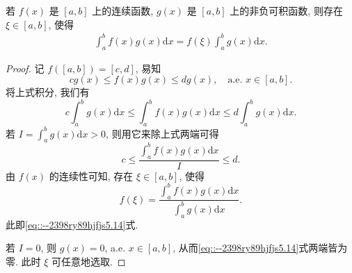 \documentclass[../../main.tex]{subfiles}%
\begin{document}
\begin{theorem}[积分第一中值公式]\label{theorem:实变函数--积分第一中值公式}
若 $f(x)$ 是 $[a,b]$ 上的连续函数, $g(x)$ 是 $[a,b]$ 上的非负可积函数, 则存在 $\xi\in[a,b]$, 使得
\begin{align}
\int_a^b f(x)g(x)\mathrm{d}x = f(\xi)\int_a^b g(x)\mathrm{d}x. \label{eq::--2398ry89hjfjs5.14}
\end{align}
\end{theorem}
\begin{proof}

记 $f([a,b])=[c,d]$, 易知
\[
cg(x) \leqslant f(x)g(x) \leqslant dg(x),\quad \text{a.e. } x\in[a,b].
\]
将上式积分, 我们有
\[
c\int_a^b g(x)\mathrm{d}x \leqslant \int_a^b f(x)g(x)\mathrm{d}x \leqslant d\int_a^b g(x)\mathrm{d}x.
\]
若 $I = \int_a^b g(x)\mathrm{d}x > 0$, 则用它来除上式两端可得
\[
c \leqslant \frac{\int_a^b f(x)g(x)\mathrm{d}x}{I} \leqslant d.
\]
由 $f(x)$ 的连续性可知, 存在 $\xi\in[a,b]$, 使得
\[
f(\xi) = \frac{\int_a^b f(x)g(x)\mathrm{d}x}{\int_a^b g(x)\mathrm{d}x}.
\]
此即\eqref{eq::--2398ry89hjfjs5.14}式.

若 $I=0$, 则 $g(x)=0$, a.e. $x\in[a,b]$, 从而\eqref{eq::--2398ry89hjfjs5.14}式两端皆为零. 此时 $\xi$ 可任意地选取.

\end{proof}
\end{document}
